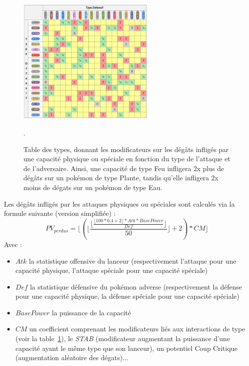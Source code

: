 \documentclass[a4paper,12pt]{article}
\begin{document}
\begin{figure}[!h]
    \centering
    \includegraphics[width=0.6\textwidth]{Image/table-des-types-pour-pokemon-arceus.jpg}
    \caption{Table des types, donnant les modificateurs sur les dégâts infligés
    par une capacité physique ou spéciale en fonction du type de l'attaque et de
    l'adversaire. Ainsi, une capacité de type Feu infligera 2x plus de dégâts
    sur un pokémon de type Plante, tandis qu'elle infligera 2x moins de dégats
    sur un pokémon de type Eau.}.
    \label{fig:image3}
\end{figure}

Les dégâts infligés par les attaques physiques ou spéciales sont calculés via la
formule suivante (version simplifiée) :
\begin{equation}
    PV_{perdus}=\lfloor ( \lfloor \frac{\lfloor \frac{\lfloor 100*0.4+2 \rfloor * Atk * BasePower}{Def}\rfloor}{50}\rfloor +2)*CM \rfloor
\end{equation}
Avec :
\begin{itemize}
    \item $Atk$ la statistique offensive du lanceur (respectivement l'attaque
    pour une capacité physique, l'attaque spéciale pour une capacité spéciale)
    \item $Def$ la statistique défensive du pokémon adverse (respectivement la
    défense pour une capacité physique, la défense spéciale pour une capacité
    spéciale)
    \item $BasePower$ la puissance de la capacité
    \item $CM$ un coefficient comprenant les modificateurs liés aux interactions
    de type (voir la table~\ref{fig:image3}), le \textit{STAB} (modificateur
    augmentant la puissance d'une capacité ayant le même type que son lanceur),
    un potentiel Coup Critique (augmentation aléatoire des dégats)...
\end{itemize}
\end{document}
